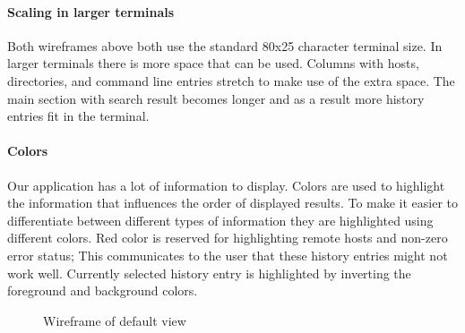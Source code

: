 \paragraph{Scaling in larger terminals}

Both wireframes above both use the standard 80x25 character terminal size. In larger terminals there is more space that can be used. Columns with hosts, directories, and command line entries stretch to make use of the extra space. The main section with search result becomes longer and as a result more history entries fit in the terminal.   

\paragraph{Colors}

Our application has a lot of information to display. 
Colors are used to highlight the information that influences the order of displayed results. To make it easier to differentiate between different types of information they are highlighted using different colors. 
Red color is reserved for highlighting remote hosts and non-zero error status; This communicates to the user that these history entries might not work well.
Currently selected history entry is highlighted by inverting the foreground and background colors.


\begin{figure}[h!]
  \caption{Wireframe of default view}
  \label{wireframe-normal}
\end{figure}

